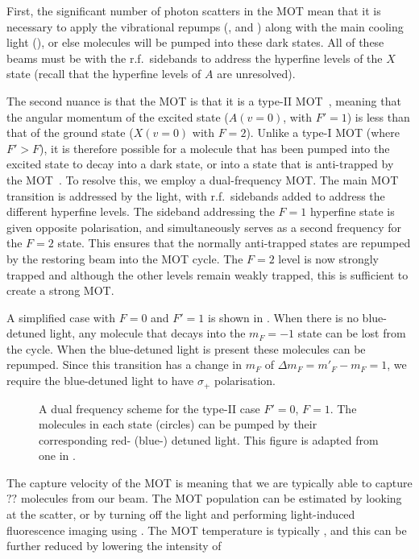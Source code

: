 First, the significant number of photon scatters  in the MOT
mean that it is necessary to apply the vibrational repumps (,
 and ) along with the main cooling light
(), or else molecules will be pumped into these dark states. All
of these beams must be  with the r.f.\ sidebands to address the
hyperfine levels of the $X$ state (recall that the hyperfine levels of $A$ are
unresolved).

The second nuance is that the \CaF{} MOT is that it is a type-II MOT~\cite{},
meaning that the angular momentum of the excited state ($A(v=0)$, with $F'=1$)
is less than that of the ground state ($X(v=0)$ with $F=2$). Unlike a type-I
MOT (where $F'>F$), it is therefore possible for a molecule that has been
pumped into the excited state to decay into a dark state, or into a state that
is anti-trapped by the MOT~\cite{}.
%
To resolve this, we employ a dual-frequency MOT. The main MOT transition is
addressed by the  light, with r.f.\ sidebands added to address the
different hyperfine levels. The sideband addressing the $F=1$ hyperfine state
is given opposite polarisation, and simultaneously serves as a second frequency
for the $F=2$ state. This ensures that the normally anti-trapped states are
repumped by the restoring beam into the MOT cycle. The $F=2$ level is now
strongly trapped and although the other levels remain weakly trapped, this is
sufficient to create a strong MOT.

A simplified case with $F=0$ and $F'=1$ is shown in
. When there is no blue-detuned light, any
molecule that decays into the $m_F=-1$ state can be lost from the cycle. When
the blue-detuned light is present these molecules can be repumped. Since this
transition has a change in $m_F$ of $\Delta m_F = m'_F- m_F=1$, we require the
blue-detuned light to have $\sigma_+$ polarisation.

\begin{figure}
  \centering
  \caption{
    A dual frequency scheme for the type-II case $F'=0$, $F=1$. The molecules
    in each state (circles) can be pumped by their corresponding red- (blue-)
    detuned light. This figure is adapted from one in .
  }
  \label{overview:fig:dualfreq}
\end{figure}

The capture velocity of the MOT is  meaning that we are typically able
to capture $??$ molecules from our beam. The MOT population can be estimated by
looking at the scatter, or by turning off the light and performing
light-induced fluorescence imaging using . The MOT temperature is
typically \cm{}, and this can be further reduced by lowering the intensity of
~\cite{Truppe2017} 

